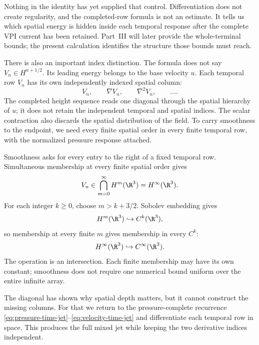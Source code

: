 Nothing in the identity has yet supplied that control.  Differentiation does
not create regularity, and the completed-row formula is not an estimate.  It
tells us which spatial energy is hidden inside each temporal response after
the complete VPI current has been retained.  Part~III will later provide the
whole-terminal bounds; the present calculation identifies the structure those
bounds must reach.

There is also an important index distinction.  The formula does not say
\(V_n\in H^{n+1/2}\).  Its leading energy belongs to the base velocity \(u\).
Each temporal row \(V_n\) has its own independently indexed spatial column:
\begin{equation*}
 V_n,\qquad
 \nabla V_n,\qquad
 \nabla^2V_n,\qquad\ldots.
\end{equation*}
The completed height sequence reads one diagonal through the spatial hierarchy
of \(u\); it does not retain the independent temporal and spatial indices.
The scalar contraction also discards the spatial distribution of the field.
To carry smoothness to the endpoint, we need every finite spatial order in
every finite temporal row, with the normalized pressure response attached.

Smoothness asks for every entry to the right of a fixed temporal row.
Simultaneous membership at every finite spatial order gives
\begin{equation*}
 V_n\in\bigcap_{m=0}^\infty H^m(\R^3)=H^\infty(\R^3).
\end{equation*}
For each integer \(k\ge0\), choose
\(m>k+3/2\).  Sobolev embedding gives
\begin{equation*}
 H^m(\R^3)\hookrightarrow C^k(\R^3),
\end{equation*}
so membership at every finite \(m\) gives membership in every \(C^k\):
\begin{equation*}
 H^\infty(\R^3)\hookrightarrow C^\infty(\R^3).
\end{equation*}
The operation is an intersection.  Each finite membership may have its own
constant; smoothness does not require one numerical bound uniform over the
entire infinite array.

The diagonal has shown why spatial depth matters, but it cannot construct the
missing columns.  For that we return to the pressure-complete recurrence
\eqref{eq:pressure-time-jet}--\eqref{eq:velocity-time-jet} and differentiate
each temporal row in space.  This produces the full mixed jet while keeping
the two derivative indices independent.

